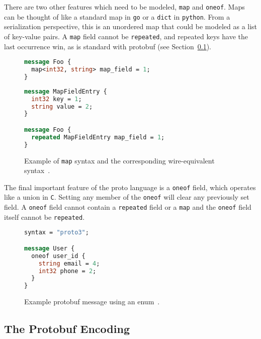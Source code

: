 \documentclass[11pt]{article}
\theoremstyle{definition}
\begin{document}
There are two other features which need to be modeled, \texttt{map} and
\texttt{oneof}. Maps can be thought of like a standard map in \texttt{go} or a
\texttt{dict} in \texttt{python}. From a serialization perspective, this is an
unordered map that could be modeled as a list of key-value pairs. A \texttt{map}
field cannot be \texttt{repeated}, and repeated keys have the last occurrence
win, as is standard with protobuf (see Section~\ref{sec:proto-enc}).

\begin{figure}[H]
	\centering
	\begin{minipage}[bt]{0.43\textwidth}
		\begin{lstlisting}[language=proto]
message Foo {
  map<int32, string> map_field = 1;
}\end{lstlisting}
	\end{minipage}
	\hspace{0.5cm}
	\begin{minipage}[bt]{0.48\textwidth}
		\begin{lstlisting}[language=proto]
message MapFieldEntry {
  int32 key = 1;
  string value = 2;
}

message Foo {
  repeated MapFieldEntry map_field = 1;
}\end{lstlisting}
	\end{minipage}

	\caption{Example of \texttt{map} syntax and the corresponding
		wire-equivalent syntax~\cite{LanguageGuideProto}.}
	\label{fig:proto-map}
\end{figure}

The final important feature of the proto language is a \texttt{oneof} field,
which operates like a union in \texttt{C}. Setting any member of the
\texttt{oneof} will clear any previously set field. A \texttt{oneof} field
cannot contain a \texttt{repeated} field or a \texttt{map} and the
\texttt{oneof} field itself cannot be \texttt{repeated}.

\begin{figure}[H]
	\begin{lstlisting}[language=proto]
syntax = "proto3";

message User {
  oneof user_id {
    string email = 4;
    int32 phone = 2;
  }
}\end{lstlisting}

	\caption{Example protobuf message using an enum~\cite{LanguageGuideProto}.}
	\label{fig:proto-enum}
\end{figure}

\subsection{The Protobuf Encoding}\label{sec:proto-enc}
\end{document}
